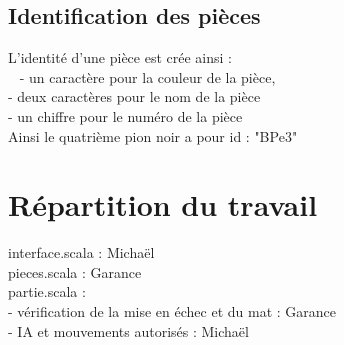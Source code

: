 \documentclass{article}
\begin{document}
\subsection{Identification des pièces}
L'identité d'une pièce est crée ainsi : \\ 
 - un caractère pour la couleur de la pièce, \\
 - deux caractères pour le nom de la pièce \\
 - un chiffre pour le numéro de la pièce \\
Ainsi le quatrième pion noir a pour id : "BPe3" \\

\section{Répartition du travail}
interface.scala : Michaël \\
pieces.scala : Garance \\
partie.scala : \\
 - vérification de la mise en échec et du mat : Garance \\
 - IA et mouvements autorisés : Michaël \\
 
\end{document}
